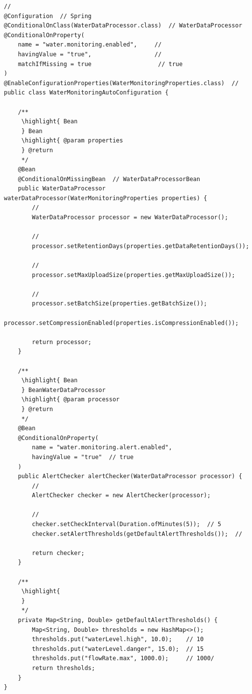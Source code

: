 \begin{lstlisting}[style=java]
// 
@Configuration  // Spring
@ConditionalOnClass(WaterDataProcessor.class)  // WaterDataProcessor
@ConditionalOnProperty(
    name = "water.monitoring.enabled",     // 
    havingValue = "true",                  // 
    matchIfMissing = true                   // true
)
@EnableConfigurationProperties(WaterMonitoringProperties.class)  // 
public class WaterMonitoringAutoConfiguration {
    
    /**
     \highlight{ Bean
     } Bean
     \highlight{ @param properties 
     } @return 
     */
    @Bean
    @ConditionalOnMissingBean  // WaterDataProcessorBean
    public WaterDataProcessor waterDataProcessor(WaterMonitoringProperties properties) {
        // 
        WaterDataProcessor processor = new WaterDataProcessor();
        
        // 
        processor.setRetentionDays(properties.getDataRetentionDays());
        
        // 
        processor.setMaxUploadSize(properties.getMaxUploadSize());
        
        // 
        processor.setBatchSize(properties.getBatchSize());
        processor.setCompressionEnabled(properties.isCompressionEnabled());
        
        return processor;
    }
    
    /**
     \highlight{ Bean
     } BeanWaterDataProcessor
     \highlight{ @param processor 
     } @return 
     */
    @Bean
    @ConditionalOnProperty(
        name = "water.monitoring.alert.enabled", 
        havingValue = "true"  // true
    )
    public AlertChecker alertChecker(WaterDataProcessor processor) {
        // 
        AlertChecker checker = new AlertChecker(processor);
        
        // 
        checker.setCheckInterval(Duration.ofMinutes(5));  // 5
        checker.setAlertThresholds(getDefaultAlertThresholds());  // 
        
        return checker;
    }
    
    /**
     \highlight{ 
     } 
     */
    private Map<String, Double> getDefaultAlertThresholds() {
        Map<String, Double> thresholds = new HashMap<>();
        thresholds.put("waterLevel.high", 10.0);    // 10
        thresholds.put("waterLevel.danger", 15.0);  // 15
        thresholds.put("flowRate.max", 1000.0);     // 1000/
        return thresholds;
    }
}
\end{lstlisting}

